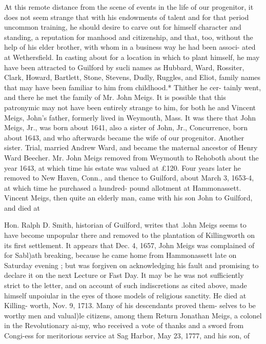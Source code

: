 \documentclass[oneside]{book}
\begin{document}
At this remote distance from the scene of events in the life of 
our progenitor, it does not seem strange that with his endowments 
of talent and for that period uncommon training, he should desire 
to carve out for himself character and standing, a reputation for 
manhood and citizenship, and that, too, without the help of his 
elder brother, with whom in a business way he had been associ- 
ated at Wethersfield. In casting about for a location in which to 
plant himself, he may have been attracted to Guilford by sucli 
names as Hubbard, Ward, Rossiter, Clark, Howard, Bartlett, 
Stone, Stevens, Dudly, Ruggles, and Eliot, family names that 
may have been familiar to him from childhood.* Thither he cer- 
tainly went, and there he met the family of Mr. John Meigs. It 
is possible that this patronymic may not have been entirely strange 
to him, for both he and Vincent Meigs, John's father, formerly 
lived in Weymouth, Mass. It was there that John Meigs, Jr., 
was born about 1641, also a sister of John, Jr., Concurrence, 
born about 1643, and who afterwards became the wife of our 
progenitor. Another sister. Trial, married Andrew Ward, and 
became the maternal ancestor of Henry Ward Beecher. Mr. 
John Meigs removed from Weymouth to Rehoboth about the year 
1643, at which time his estate was valued at £120. Four years 
later he removed to New Haven, Conn., and thence to Guilford, 
about March 3, 1653-4, at which time he purchased a hundred- 
pound allotment at Hammonassett. Vincent Meigs, then quite 
an elderly man, came with his son John to Guilford, and died at 

Hon. Ralph D. Smith, historian of Guilford, writes that .lohn 
Meigs seems to have become unpopular there and removed to the 
plantation of Killingworth on its first settlement. It appears 
that Dec. 4, 1657, John Meigs was complained of for Sabl)ath 
breaking, because he came home from Hammonassett late on 
Saturday evening ; but was forgiven on acknowledging his fault 
and promising to declare it on the next Lecture or Fast Day. It 
may be he was not sufficiently strict to the letter, and on account 
of such indiscretions as cited above, made himself unpoiular in 
the eyes of those models of religious sanctity. He died at Killing- 
worth, Nov. 9, 1713. Many of his descendants proved them- 
selves to be worthy men and valual)le citizens, among them 
Return Jonathan Meigs, a colonel in the Revolutionary ai-my, 
who received a vote of thanks and a sword from Congi-ess for 
meritorious service at Sag Harbor, May 23, 1777, and his son, of 
\end{document}
